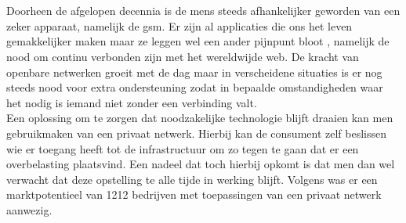 
\chapter{}%
\label{ch:inleiding}

Doorheen de afgelopen decennia is de mens steeds afhankelijker geworden van een zeker apparaat, namelijk de gsm. Er zijn al applicaties die ons het leven gemakkelijker maken maar ze leggen wel een ander pijnpunt bloot , namelijk de nood om continu verbonden zijn met het wereldwijde web. De kracht van openbare netwerken groeit met de dag maar in verscheidene situaties is er nog steeds nood voor extra ondersteuning zodat in bepaalde omstandigheden waar het nodig is iemand niet zonder een verbinding valt. \\

Een oplossing om te zorgen dat noodzakelijke technologie blijft draaien kan men gebruikmaken van een privaat netwerk. Hierbij kan de consument zelf beslissen wie er toegang heeft tot de infrastructuur om zo tegen te gaan dat er een overbelasting plaatsvind. Een nadeel dat toch hierbij opkomt is dat men dan wel verwacht dat deze opstelling te alle tijde in werking blijft. Volgens \textcite{Dux2023} was er een marktpotentieel van 1212 bedrijven met toepassingen van een privaat netwerk aanwezig. 
\section{}%
\label{sec:probleemstelling}


